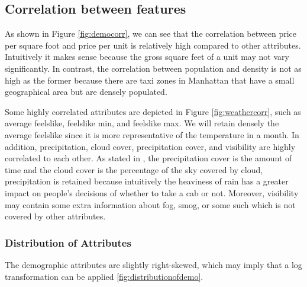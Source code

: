 \documentclass[11pt]{article}
\begin{document}
\subsection{Correlation between features}
As shown in Figure \ref{fig:democorr}, we can see that the correlation between price per square foot and price per unit is relatively high compared to other attributes. Intuitively it makes sense because the gross square feet of a unit may not vary significantly. In contrast, the correlation between population and density is not as high as the former because there are taxi zones in Manhattan that have a small geographical area but are densely populated. 

Some highly correlated attributes are depicted in Figure \ref{fig:weathercorr}, such as average feelslike, feelslike min, and feelslike max. We will retain densely the average feelslike since it is more representative of the temperature in a month. In addition, precipitation, cloud cover, precipitation cover, and visibility are highly correlated to each other. As stated in \cite{weathermetadata}, the precipitation cover is the amount of time and the cloud cover is the percentage of the sky covered by cloud, precipitation is retained because intuitively the heaviness of rain has a greater impact on people's decisions of whether to take a cab or not. Moreover, visibility may contain some extra information about fog, smog, or some such which is not covered by other attributes. 
\subsubsection{Distribution of Attributes}
The demographic attributes are slightly right-skewed, which may imply that a log transformation can be applied \ref{fig:distributionofdemo}.
\end{document}

